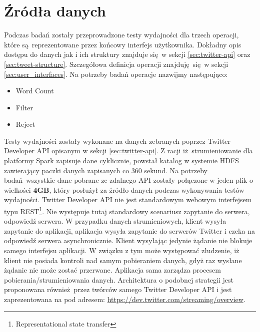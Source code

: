 \section{Źródła danych}
Podczas badań zostały przeprowadzone testy wydajności dla trzech operacji, które są reprezentowane przez końcowy interfejs użytkownika. Dokładny opis dostępu do danych jak i ich struktury znajduje się w sekcji \ref{sec:twitter-api} oraz \ref{sec:tweet-structure}. Szczegółowa definicja operacji znajduję się w sekcji \ref{sec:user_interfaces}. 
Na potrzeby badań operacje nazwijmy następująco:
\begin{itemize}
	\item {Word Count}
	\item {Filter}
	\item {Reject}
\end{itemize}
Testy wydajności zostały wykonane na danych zebranych poprzez Twitter Developer API opisanym w sekcji \ref{sec:twitter-api}. Z racji iż strumieniowanie dla platformy Spark zapisuje dane cyklicznie, powstał katalog w systemie HDFS zawierający paczki danych zapisanych co 360 sekund. Na potrzeby badań wszystkie dane pobrane ze zdalnego API zostały połączone w jeden plik o wielkości \textbf{4GB}, który posłużył za źródło danych podczas wykonywania testów wydajności. Twitter Developer API nie jest standardowym webowym interfejsem typu REST\footnote{Representational state transfer}. Nie występuje tutaj standardowy scenariusz zapytanie do serwera, odpowiedź serwera. W przypadku danych strumieniowych, klient wysyła zapytanie do aplikacji, aplikacja wysyła zapytanie do serwerów Twitter i czeka na odpowiedź serwera asynchronicznie. Klient wysyłając jedynie żądanie nie blokuje samego interfejsu aplikacji. W związku z tym może występować złudzenie, iż klient nie posiada kontroli nad samym pobieraniem danych, gdyż raz wysłane żądanie nie może zostać przerwane. Aplikacja sama zarządza procesem pobierania/strumieniowania danych. Architektura o podobnej strategii jest proponowana również przez twórców samego Twitter Developer API i jest zaprezentowana na pod adresem: \url{https://dev.twitter.com/streaming/overview}.

